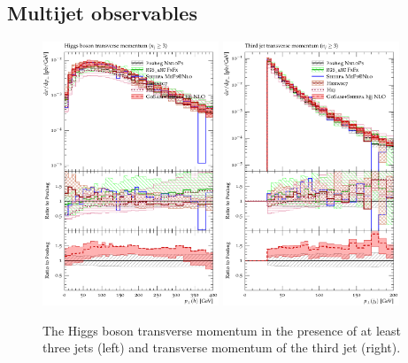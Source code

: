 
\subsection{Multijet observables}
\label{sec:hjetscomp:results:mjobs}

\begin{figure}[t!]
  \centering
  \includegraphics[width=0.47\textwidth]{figures/hjetscomp_H_jjj_pT_incl.pdf}
  \quad
  \includegraphics[width=0.47\textwidth]{figures/hjetscomp_jet3_pT_incl.pdf}
  \caption{
    The Higgs boson transverse momentum in the presence of at least three 
    jets (left) and transverse momentum of the third jet (right).
    \label{fig:higgscomp:results:mobs:hpt_j3pt}
  }
\end{figure}

